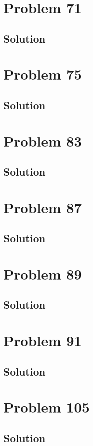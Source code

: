 \documentclass[12pt]{article}
\begin{document}
    \pagebreak
    \section{Problem 71}

        \subsection{Solution}

    \pagebreak
    \section{Problem 75}

        \subsection{Solution}

    \pagebreak
    \section{Problem 83}

        \subsection{Solution}

    \pagebreak
    \section{Problem 87}

        \subsection{Solution}

    \pagebreak
    \section{Problem 89}

        \subsection{Solution}

    \pagebreak
    \section{Problem 91}

        \subsection{Solution}

    \pagebreak
    \section{Problem 105}

        \subsection{Solution}

    \pagebreak
    \tableofcontents
\end{document}
